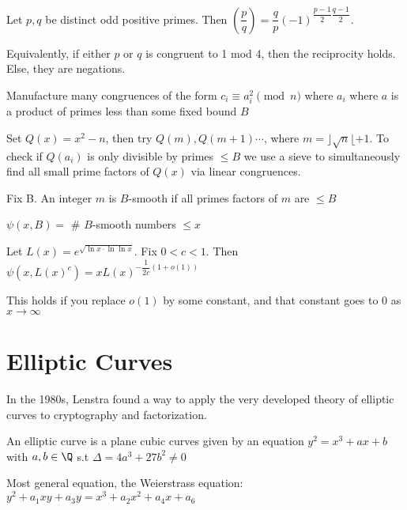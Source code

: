 \documentclass[10pt]{article}
\begin{document}
\begin{defn}
    Let $p, q$ be distinct odd positive primes. Then $\left(\dfrac{p}{q}\right) = \dfrac{q}{p}(-1)^{\dfrac{p-1}{2}\dfrac{q-1}{2}}$.
\end{defn}
Equivalently, if either $p$ or $q$ is congruent to 1 mod 4, then the reciprocity holds. Else, they are negations.
\begin{defn} 
    
\end{defn}
Manufacture many congruences of the form $c_i \equiv a_i^2 \pmod{n}$ where $a_i$ where $a$ is a product of primes less than some fixed bound $B$

Set $Q(x) = x^2 - n$, then try $Q(m), Q(m + 1) \cdots$, where $m = \rfloor\sqrt n \lfloor + 1$. To check if $Q(a_i)$ is only divisible by primes $\leq B$ we use a sieve to simultaneously find all small prime factors of $Q(x)$ via linear congruences. 

\begin{defn}
    Fix B. An integer $m$ is $B$-smooth if all primes factors of $m$ are $\leq B$
\end{defn}

\begin{defn}
    $\psi(x, B) = $ \# $B$-smooth numbers $\leq x$
\end{defn}

\begin{thm}
    Let $L(x) = e^{\sqrt{\ln x \cdot \ln\ln x}}$. Fix $0 < c < 1$. Then $\psi(x, L(x)^c) = xL(x)^{-\dfrac{1}{2c}(1 + o(1))}$
\end{thm}
This holds if you replace $o(1)$ by some constant, and that constant goes to 0 as $x\to\infty$

\section{Elliptic Curves}
In the 1980s, Lenstra found a way to apply the very developed theory of elliptic curves to cryptography and factorization. 

\begin{defn}
    An elliptic curve is a plane cubic curves given by an equation $y^2 = x^3 + ax + b$ with $a, b \in \Q$ s.t $\Delta = 4a^3 + 27b^2 \neq 0$
\end{defn}

\begin{rmk}
    Most general equation, the Weierstrass equation: $y^2 + a_1xy + a_3y = x^3 + a_2x^2 + a_4x + a_6$
\end{rmk}
\end{document}
